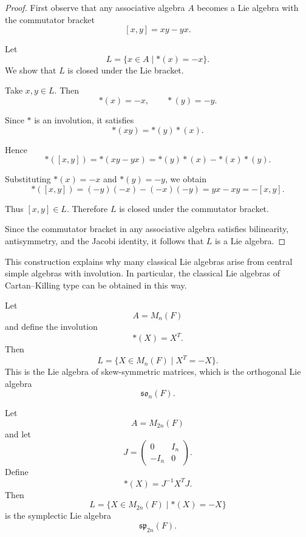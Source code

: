 \begin{proof}
    First observe that any associative algebra $A$ becomes a Lie algebra
    with the commutator bracket
    \[
        [x,y]=xy-yx .
    \]

    Let
    \[
        L=\{x\in A\mid *(x)=-x\}.
    \]
    We show that $L$ is closed under the Lie bracket.

    Take $x,y\in L$. Then
    \[
        *(x)=-x,\qquad *(y)=-y.
    \]

    Since $*$ is an involution, it satisfies
    \[
        *(xy)=*(y)*(x).
    \]

    Hence
    \[
        *([x,y])
        =*(xy-yx)
        =*(y)*(x)-*(x)*(y).
    \]

    Substituting $*(x)=-x$ and $*(y)=-y$, we obtain
    \[
        *([x,y])
        =(-y)(-x)-(-x)(-y)
        =yx-xy
        =-[x,y].
    \]

    Thus $[x,y]\in L$. Therefore $L$ is closed under the commutator bracket.

    Since the commutator bracket in any associative algebra satisfies
    bilinearity, antisymmetry, and the Jacobi identity,
    it follows that $L$ is a Lie algebra.
\end{proof}

This construction explains why many classical Lie algebras arise from
central simple algebras with involution.  In particular, the classical
Lie algebras of Cartan--Killing type can be obtained in this way.

\begin{example}
    Let
    \[
        A=M_n(F)
    \]
    and define the involution
    \[
        *(X)=X^{T}.
    \]
    Then
    \[
        L=\{X\in M_n(F)\mid X^T=-X\}.
    \]
    This is the Lie algebra of skew-symmetric matrices, which is the
    orthogonal Lie algebra
    \[
        \mathfrak{so}_n(F).
    \]
\end{example}

\begin{example}
    Let
    \[
        A=M_{2n}(F)
    \]
    and let
    \[
        J=
        \begin{pmatrix}
            0    & I_n \\
            -I_n & 0
        \end{pmatrix}.
    \]
    Define
    \[
        *(X)=J^{-1}X^{T}J.
    \]
    Then
    \[
        L=\{X\in M_{2n}(F)\mid *(X)=-X\}
    \]
    is the symplectic Lie algebra
    \[
        \mathfrak{sp}_{2n}(F).
    \]
\end{example}

